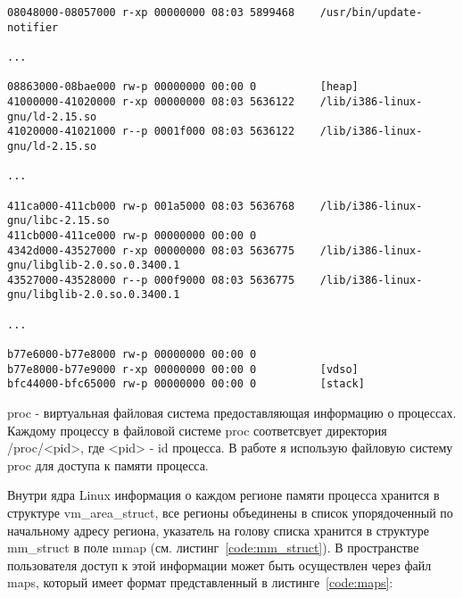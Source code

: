 \begin{lstlisting}[caption=Формат файла maps, label=code:maps]
08048000-08057000 r-xp 00000000 08:03 5899468    /usr/bin/update-notifier

...

08863000-08bae000 rw-p 00000000 00:00 0          [heap]
41000000-41020000 r-xp 00000000 08:03 5636122    /lib/i386-linux-gnu/ld-2.15.so
41020000-41021000 r--p 0001f000 08:03 5636122    /lib/i386-linux-gnu/ld-2.15.so

...

411ca000-411cb000 rw-p 001a5000 08:03 5636768    /lib/i386-linux-gnu/libc-2.15.so
411cb000-411ce000 rw-p 00000000 00:00 0 
4342d000-43527000 r-xp 00000000 08:03 5636775    /lib/i386-linux-gnu/libglib-2.0.so.0.3400.1
43527000-43528000 r--p 000f9000 08:03 5636775    /lib/i386-linux-gnu/libglib-2.0.so.0.3400.1

...

b77e6000-b77e8000 rw-p 00000000 00:00 0 
b77e8000-b77e9000 r-xp 00000000 00:00 0          [vdso]
bfc44000-bfc65000 rw-p 00000000 00:00 0          [stack]
\end{lstlisting}

proc - виртуальная файловая система предоставляющая информацию о процессах. Каждому процессу в файловой системе proc соответсвует директория /proc/<pid>, где <pid> - id процесса. В работе я использую файловую систему proc для доступа к памяти процесса.

Внутри ядра Linux информация о каждом регионе памяти процесса хранится в структуре vm\_area\_struct, все регионы объединены в список упорядоченный по начальному адресу региона, указатель на голову списка хранится в структуре mm\_struct в поле mmap (см. листинг~\ref{code:mm_struct}). В пространстве пользователя доступ к этой информации может быть осуществлен через файл maps, который имеет формат представленный в листинге~\ref{code:maps}: 

